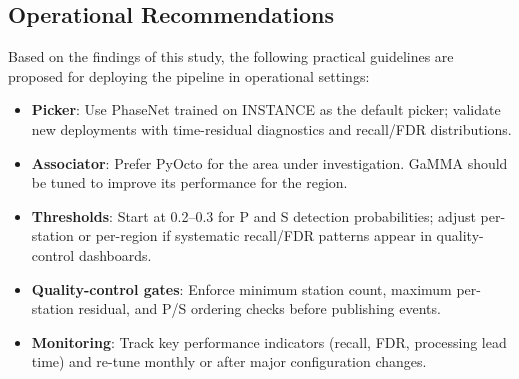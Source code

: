 \subsection{Operational Recommendations}
Based on the findings of this study, the following practical guidelines are
proposed for deploying the pipeline in operational settings:
\begin{itemize}
  \item \textbf{Picker}: Use PhaseNet trained on INSTANCE as the default
    picker; validate new deployments with time-residual diagnostics and
    recall/\ac{FDR} distributions.
  \item \textbf{Associator}: Prefer PyOcto for the area under investigation.
    GaMMA should be tuned to improve its performance for the region.
  \item \textbf{Thresholds}: Start at 0.2--0.3 for P and S detection
    probabilities; adjust per-station or per-region if systematic
    recall/\ac{FDR} patterns appear in quality-control dashboards.
  \item \textbf{Quality-control gates}: Enforce minimum station count, maximum
    per-station residual, and P/S ordering checks before publishing events.
  \item \textbf{Monitoring}: Track key performance indicators (recall,
    \ac{FDR}, processing lead time) and re-tune monthly or after major
    configuration changes.
\end{itemize}

